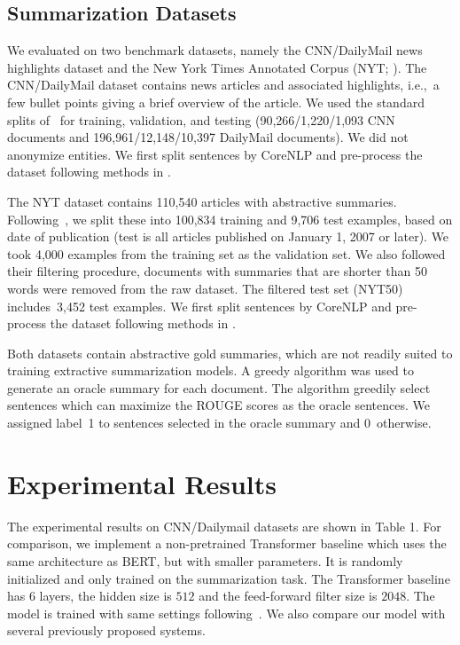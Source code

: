     \subsection{Summarization Datasets}
    We evaluated  on two benchmark datasets, namely the
    CNN/DailyMail news highlights dataset \cite{hermann2015teaching} and
    the New York Times Annotated Corpus (NYT; \citealt{nytcorpus}).
    The CNN/DailyMail dataset contains news articles and associated
    highlights, i.e.,~a few bullet points giving a brief overview of the
    article.  We used the standard splits of~\citet{hermann2015teaching}
    for training, validation, and testing (90,266/1,220/1,093 CNN
    documents and 196,961/12,148/10,397 DailyMail documents). We did not
    anonymize entities.
    We first split sentences by CoreNLP and pre-process the dataset following methods in \citet{see-acl17}.

    
    
    The NYT dataset contains 110,540 articles with abstractive
    summaries. Following~\citet{durrett2016learning}, we split these into
    100,834 training and 9,706 test examples, based on date of publication
    (test is all articles published on January 1, 2007 or later).  
    We took 4,000 examples from the training set as the validation set.
    We also
    followed their filtering procedure, documents  with summaries that
    are shorter than 50 words were removed from the raw dataset.  The
    filtered test set (NYT50) includes~3,452 test examples.
        We first split sentences by CoreNLP and pre-process the dataset following methods in \citet{durrett2016learning}.
    
    
    Both datasets contain abstractive gold summaries, which are not
    readily suited to training extractive summarization models. A greedy
    algorithm was used to
    generate an oracle summary for each document. The algorithm
    greedily select sentences which can maximize the ROUGE scores as the oracle sentences.
 We assigned label~1 to sentences selected in the oracle
    summary and 0~otherwise.
    

    
    
    
    \section{Experimental Results}
    The experimental results on CNN/Dailymail datasets are shown in Table 1.
            For comparison, we implement a non-pretrained Transformer baseline which uses the same architecture as BERT, but with smaller parameters. It is randomly initialized and only trained on the summarization task. The Transformer baseline has 6 layers, the hidden size is $512$ and the feed-forward filter size is $2048$. The model is trained with same settings following~\citet{vaswani2017attention}.   
    We also compare our model with several previously proposed systems.        

